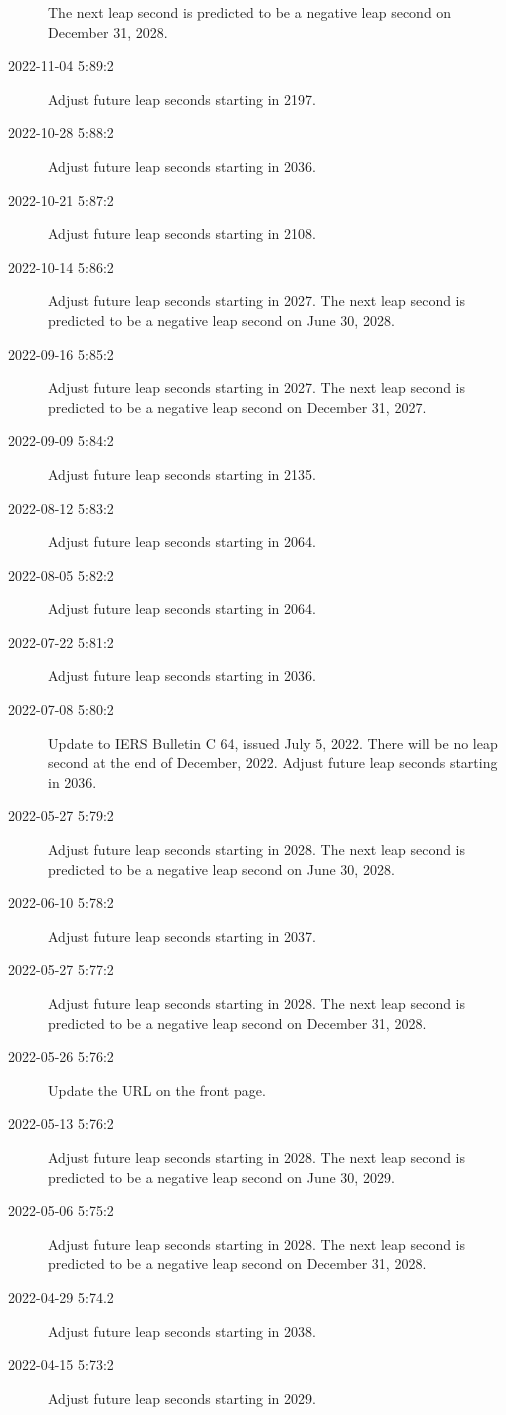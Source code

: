 \documentclass[letterpaper,twoside]{article}
\begin{document}
\begin{description}
  The next leap second is predicted to be a negative leap second
  on December 31, 2028.
\item[2022-11-04 5:89:2]Adjust future leap seconds starting in 2197.
\item[2022-10-28 5:88:2]Adjust future leap seconds starting in 2036.
\item[2022-10-21 5:87:2]Adjust future leap seconds starting in 2108.
\item[2022-10-14 5:86:2]Adjust future leap seconds starting in 2027.
  The next leap second is predicted to be a negative leap second
  on June 30, 2028.
\item[2022-09-16 5:85:2]Adjust future leap seconds starting in 2027.
  The next leap second is predicted to be a negative leap second
  on December 31, 2027.
\item[2022-09-09 5:84:2]Adjust future leap seconds starting in 2135.
\item[2022-08-12 5:83:2]Adjust future leap seconds starting in 2064.
\item[2022-08-05 5:82:2]Adjust future leap seconds starting in 2064.
\item[2022-07-22 5:81:2]Adjust future leap seconds starting in 2036.
\item[2022-07-08 5:80:2]Update to IERS Bulletin C 64,
  issued July 5, 2022.
  There will be no leap second at the end of December, 2022.
  Adjust future leap seconds starting in 2036.
\item[2022-05-27 5:79:2]Adjust future leap seconds starting in 2028.
  The next leap second is predicted to be a negative leap second
  on June 30, 2028.
\item[2022-06-10 5:78:2]Adjust future leap seconds starting in 2037.
\item[2022-05-27 5:77:2]Adjust future leap seconds starting in 2028.
  The next leap second is predicted to be a negative leap second
  on December 31, 2028.
\item[2022-05-26 5:76:2]Update the URL on the front page.
\item[2022-05-13 5:76:2]Adjust future leap seconds starting in 2028.
  The next leap second is predicted to be a negative leap second
  on June 30, 2029.
\item[2022-05-06 5:75:2]Adjust future leap seconds starting in 2028.
  The next leap second is predicted to be a negative leap second
  on December 31, 2028.
\item[2022-04-29 5:74.2]Adjust future leap seconds starting in 2038.
\item[2022-04-15 5:73:2]Adjust future leap seconds starting in 2029.

\end{description}
\end{document}
